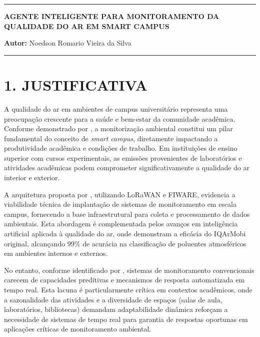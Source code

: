 \documentclass[12pt, a4paper]{article}
\begin{document}
\begin{center}
    
    
    \vspace{1cm}
    
    \rule{\textwidth}{1pt}
    
    \vspace{0.5cm}
    
    \textbf{AGENTE INTELIGENTE PARA MONITORAMENTO DA QUALIDADE
DO AR EM SMART CAMPUS}
    
    \vspace{0.5cm}
    
    \textbf{Autor:} Noedson Romario Vieira da Silva
    
    \vspace{0.5cm}
    
    \rule{\textwidth}{1pt}
\end{center}

\section*{1. JUSTIFICATIVA}

\justifying{}
A qualidade do ar em ambientes de campus universitário representa uma
preocupação crescente para a saúde e bem-estar da comunidade acadêmica.
Conforme demonstrado por \cite{minallah2020}, a monitorização ambiental
constitui um pilar fundamental do conceito de \textit{smart campus},
diretamente impactando a produtividade acadêmica e condições de trabalho.
Em instituições de ensino superior com cursos experimentais, as emissões
provenientes de laboratórios e atividades acadêmicas podem comprometer
significativamente a qualidade do ar interior e exterior.

A arquitetura proposta por \cite{cunha2024}, utilizando LoRaWAN e FIWARE,
evidencia a viabilidade técnica de implantação de sistemas de monitoramento
em escala campus, fornecendo a base infraestrutural para coleta e
processamento de dados ambientais. Esta abordagem é complementada pelos
avanços em inteligência artificial aplicada à qualidade do ar, onde
\cite{thaylor2024} demonstram a eficácia do IQArMobi original, alcançando
99\% de acurácia na classificação de poluentes atmosféricos em ambientes
internos e externos.

No entanto, conforme identificado por \cite{wang2023}, sistemas de
monitoramento convencionais carecem de capacidades preditivas e
mecanismos de resposta automatizada em tempo real. Esta lacuna é
particularmente crítica em contextos acadêmicos, onde a sazonalidade
das atividades e a diversidade de espaços (salas de aula, laboratórios,
bibliotecas) demandam adaptabilidade dinâmica \cite{reddy2023} reforçam
a necessidade de sistemas de tempo real para garantia de respostas
oportunas em aplicações críticas de monitoramento ambiental.
\end{document}
